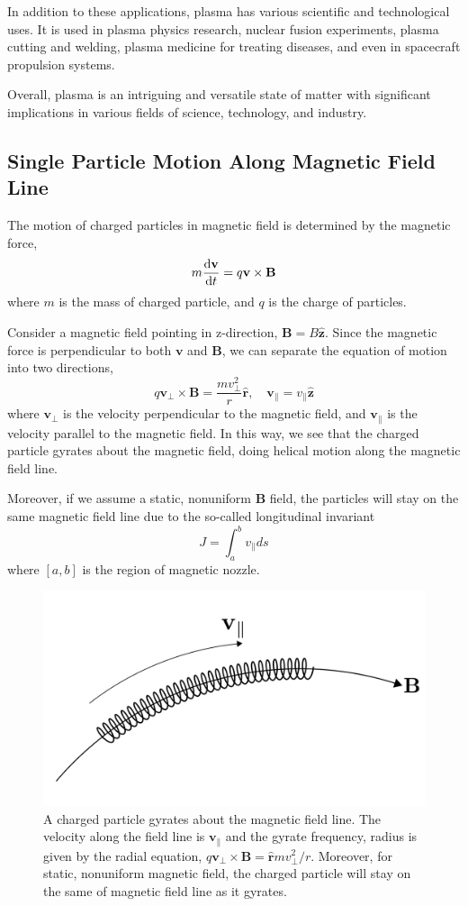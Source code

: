 In addition to these applications, plasma has various scientific and technological uses. 
It is used in plasma physics research, nuclear fusion experiments, plasma cutting and welding, plasma medicine for treating diseases, and even in spacecraft propulsion systems.

Overall, plasma is an intriguing and versatile state of matter with significant implications in various fields of science, technology, and industry.

\subsection{Single Particle Motion Along Magnetic Field Line}
The motion of charged particles in magnetic field is determined by the magnetic force,
\[ m\dv{\mathbf{v}}{t} = q\mathbf{v\times B} \]
where $m$ is the mass of charged particle, and $q$ is the charge of particles.

Consider a magnetic field pointing in z-direction, $\mathbf{B}=B\mathbf{\hat{z}}$. Since the magnetic force is perpendicular to both $\mathbf{v}$ and $\mathbf{B}$, we can separate the equation of motion into two directions,
\[ 
q\mathbf{v_{\perp}\times B} = \frac{mv_{\perp}^2}{r}\mathbf{\hat{r}}, 
\quad
\mathbf{v}_{\parallel} = v_{\parallel} \mathbf{\hat{z}} \]
where $\mathbf{v}_{\perp}$ is the velocity perpendicular to the magnetic field, and $\mathbf{v}_{\parallel}$ is the velocity parallel to the magnetic field. In this way, we see that the charged particle gyrates about the magnetic field, doing helical motion along the magnetic field line. 

Moreover, if we assume a static, nonuniform $\mathbf{B}$ field, the particles will stay on the same magnetic field line due to the so-called longitudinal invariant 
\[J = \int_{a}^{b} v_{\parallel} ds\]
where $[a,b]$ is the region of magnetic nozzle.  
\begin{figure}[H]
	\centering
	\includegraphics[width=0.7\linewidth]{img/governing-equations/gyrate-along-b-field}
	\caption{A charged particle gyrates about the magnetic field line. The velocity along the field line is $\mathbf{v}_{\parallel}$ and the gyrate frequency, radius is given by the radial equation, $q\mathbf{v_{\perp}\times B} = \mathbf{\hat{r}} mv_\perp^2/r$. Moreover, for static, nonuniform magnetic field, the charged particle will stay on the same of magnetic field line as it gyrates.}
	\label{fig:gyrate-along-b-field}
\end{figure}


